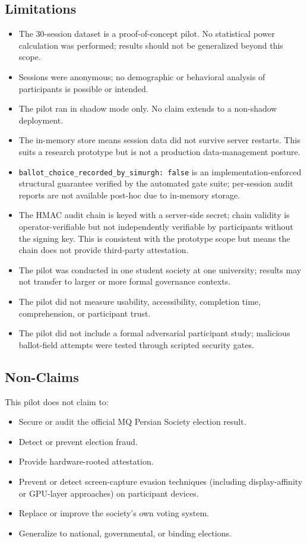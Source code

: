 \documentclass[conference]{IEEEtran}
\begin{document}
\subsection{Limitations}

\begin{itemize}
  \item The 30-session dataset is a proof-of-concept pilot. No statistical
    power calculation was performed; results should not be generalized beyond
    this scope.
  \item Sessions were anonymous; no demographic or behavioral analysis of
    participants is possible or intended.
  \item The pilot ran in shadow mode only. No claim extends to a non-shadow
    deployment.
  \item The in-memory store means session data did not survive server restarts.
    This suits a research prototype but is not a production data-management
    posture.
  \item \texttt{ballot\_choice\_recorded\_by\_simurgh: false} is an
    implementation-enforced structural guarantee verified by the automated gate
    suite; per-session audit reports are not available post-hoc due to in-memory
    storage.
  \item The HMAC audit chain is keyed with a server-side secret; chain validity
    is operator-verifiable but not independently verifiable by participants
    without the signing key. This is consistent with the prototype scope but
    means the chain does not provide third-party attestation.
  \item The pilot was conducted in one student society at one university;
    results may not transfer to larger or more formal governance contexts.
  \item The pilot did not measure usability, accessibility, completion time,
    comprehension, or participant trust.
  \item The pilot did not include a formal adversarial participant study;
    malicious ballot-field attempts were tested through scripted security gates.
\end{itemize}

\subsection{Non-Claims}

This pilot does not claim to:
\begin{itemize}
  \item Secure or audit the official MQ Persian Society election result.
  \item Detect or prevent election fraud.
  \item Provide hardware-rooted attestation.
  \item Prevent or detect screen-capture evasion techniques (including
    display-affinity or GPU-layer approaches) on participant devices.
  \item Replace or improve the society's own voting system.
  \item Generalize to national, governmental, or binding elections.
\end{itemize}
\end{document}
